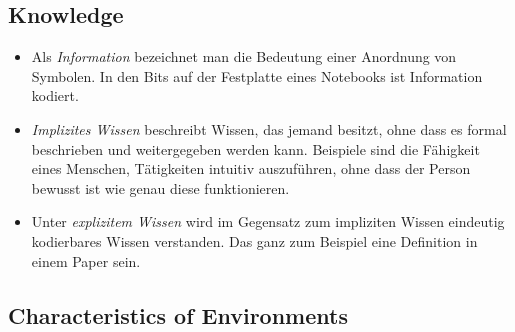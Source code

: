 \documentclass[a4paper]{scrartcl}
\begin{document}
\subsection*{Knowledge}
\begin{itemize}
    \item
        Als \emph{Information} bezeichnet man die Bedeutung einer Anordnung von
        Symbolen. In den Bits auf der Festplatte eines Notebooks ist
        Information kodiert.

    \item
        \emph{Implizites Wissen} beschreibt Wissen, das jemand besitzt, ohne
        dass es formal beschrieben und weitergegeben werden kann. Beispiele
        sind die Fähigkeit eines Menschen, Tätigkeiten intuitiv auszuführen,
        ohne dass der Person bewusst ist wie genau diese funktionieren.

    \item
        Unter \emph{explizitem Wissen} wird im Gegensatz zum impliziten Wissen
        eindeutig kodierbares Wissen verstanden.  Das ganz zum Beispiel eine
        Definition in einem Paper sein.

\end{itemize}

\subsection*{Characteristics of Environments}
\end{document}
